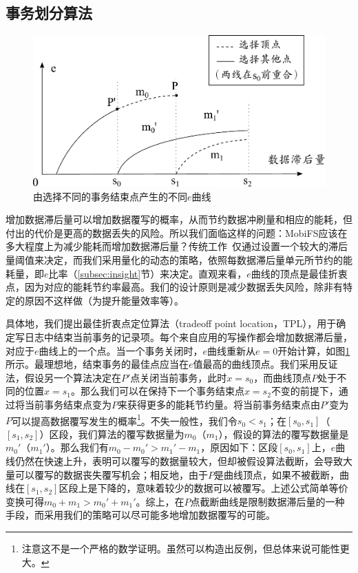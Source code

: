 \subsection{事务划分算法}
\label{subsec:point}

\begin{figure}
\centering
\includegraphics[width=0.7\columnwidth]{figures/tpl}
\caption{由选择不同的事务结束点产生的不同$e$曲线}
\label{fig:tpl}
\end{figure}

增加数据滞后量可以增加数据覆写的概率，从而节约数据冲刷量和相应的能耗，但付出的代价是更高的数据丢失的风险。所以我们面临这样的问题：MobiFS应该在多大程度上为减少能耗而增加数据滞后量？传统工作~\cite{Ma:2011:LPF:1989323.1989325, Mickens:2014:BFC:2616448.2616473, Ports:2010:TCA:1924943.1924963}仅通过设置一个较大的滞后量阈值来决定，而我们采用量化的动态的策略，依照每数据滞后量单元所节约的能耗量，即$e$比率（\ref{subsec:insight}节）来决定。直观来看，$e$曲线的顶点是最佳折衷点，因为对应的能耗节约率最高。我们的设计原则是减少数据丢失风险，除非有特定的原因不这样做（为提升能量效率等）。 

具体地，我们提出最佳折衷点定位算法（tradeoff point location，TPL），用于确定写日志中结束当前事务的记录项。每个来自应用的写操作都会增加数据滞后量，对应于$e$曲线上的一个点。当一个事务关闭时，$e$曲线重新从$e=0$开始计算，如图\ref{fig:tpl}所示。最理想地，结束事务的最佳点应当在$e$值最高的曲线顶点。我们采用反证法，假设另一个算法决定在$P'$点关闭当前事务，此时$x = s_0$，而曲线顶点$P$处于不同的位置$x = s_1$。那么我们可以在保持下一个事务结束点$x = s_2$不变的前提下，通过将当前事务结束点变为$P$来获得更多的能耗节约量。将当前事务结束点由$P'$变为$P$可以提高数据覆写发生的概率\footnote{注意这不是一个严格的数学证明。虽然可以构造出反例，但总体来说可能性更大。}。不失一般性，我们令$s_0 < s_1$；在$[s_0, s_1]$（$[s_1, s_2]$）区段，我们算法的覆写数据量为$m_0$（$m_1$），假设的算法的覆写数据量是$m_0'$（$m_1'$）。那么我们有$m_0 - m_0' > m_1' -
m_1$，原因如下：区段$[s_0, s_1]$上，$e$曲线仍然在快速上升，表明可以覆写的数据量较大，但却被假设算法截断，会导致大量可以覆写的数据丧失覆写机会；相反地，由于$P$是曲线顶点，如果不被截断，曲线在$[s_1, s_2]$区段上是下降的，意味着较少的数据可以被覆写。上述公式简单等价变换可得$m_0 + m_1 > m_0' + m_1'$。综上，在$P$点截断曲线是限制数据滞后量的一种手段，而采用我们的策略可以尽可能多地增加数据覆写的可能。
 
